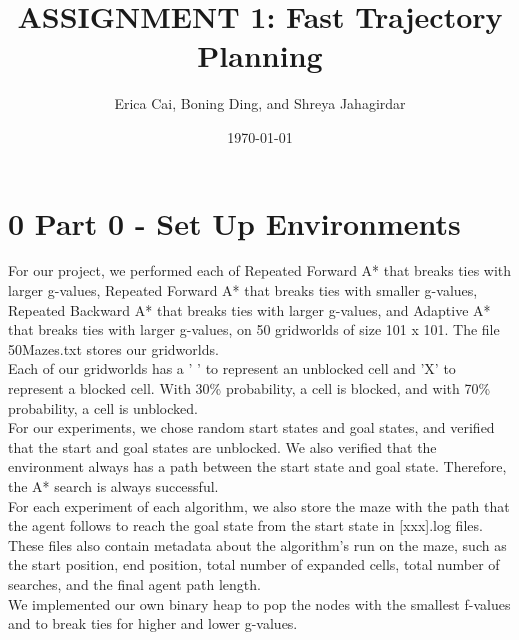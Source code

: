 \documentclass{article}
\title{ASSIGNMENT 1: Fast Trajectory Planning} %
\author{Erica Cai, Boning Ding, and Shreya Jahagirdar} %
\date{\today} %
\begin{document}
\maketitle %




\section*{0 Part 0 - Set Up Environments}

For our project, we performed each of Repeated Forward A* that breaks ties with larger g-values, Repeated Forward A* that breaks ties with smaller g-values, Repeated Backward A* that breaks ties with larger g-values, and Adaptive A* that breaks ties with larger g-values, on 50 gridworlds of size 101 x 101. The file 50Mazes.txt stores our gridworlds. \\

Each of our gridworlds has a ' ' to represent an unblocked cell and 'X' to represent a blocked cell. With 30\% probability, a cell is blocked, and with 70\% probability, a cell is unblocked. \\

For our experiments, we chose random start states and goal states, and verified that the start and goal states are unblocked. We also verified that the environment always has a path between the start state and goal state. Therefore, the A* search is always successful. \\

For each experiment of each algorithm, we also store the maze with the path that the agent follows to reach the goal state from the start state in [xxx].log files. These files also contain metadata about the algorithm's run on the maze, such as the start position, end position, total number of expanded cells, total number of searches, and the final agent path length. \\

We implemented our own binary heap to pop the nodes with the smallest f-values and to break ties for higher and lower g-values.
\end{document}
